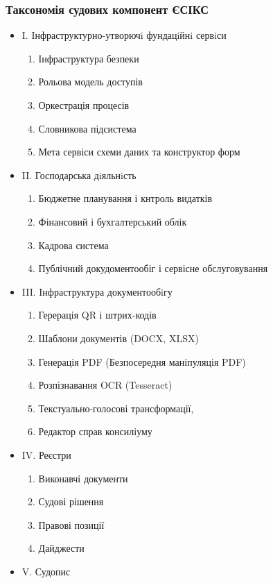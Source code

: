 \documentclass{article}
\begin{document}
\newpage
\subsubsection{Таксономія судових компонент ЄСІКС}

\begin{itemize}
\item I. Iнфраструктурно-утворючi фундацiйнi сервiси
\begin{enumerate}
\item Інфраструктура безпеки
\item Рольова модель доступів
\item Оркестрація процесів
\item Словникова підсистема
\item Мета сервіси схеми даних та конструктор форм
\end{enumerate}
\item II. Господарська дiяльнiсть
\begin{enumerate}
\item Бюджетне планування і кнтроль видатків
\item Фінансовий і бухгалтерський облік
\item Кадрова система
\item Публічний докудоментообіг і сервісне обслуговування
\end{enumerate}
\item III. Iнфраструктура документообiгу
\begin{enumerate}
\item Герерація QR і штрих-кодів
\item Шаблони документів (DOCX, XLSX)
\item Генерація PDF (Безпосередня маніпуляція PDF)
\item Розпізнавання OCR (Tesseract)
\item Текстуально-голосові трансформації,
\item Редактор справ консиліуму
\end{enumerate}
\item IV. Реєстри
\begin{enumerate}
\item Виконавчі документи
\item Судові рішення
\item Правові позиції
\item Дайджести
\end{enumerate}
\item V. Судопис
\begin{enumerate}

\end{enumerate}
\end{itemize}
\end{document}
